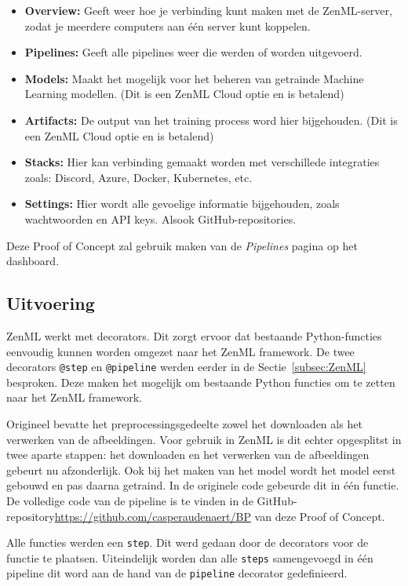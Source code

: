 \begin{itemize}
    \item \textbf{Overview:} Geeft weer hoe je verbinding kunt maken met de ZenML-server, zodat je meerdere computers aan één server kunt koppelen.
    \item \textbf{Pipelines:} Geeft alle pipelines weer die werden of worden uitgevoerd.
    \item \textbf{Models:} Maakt het mogelijk voor het beheren van getrainde Machine Learning modellen. (Dit is een ZenML Cloud optie en is betalend)
    \item \textbf{Artifacts:} De output van het training process word hier bijgehouden. (Dit is een ZenML Cloud optie en is betalend)
    \item \textbf{Stacks:} Hier kan verbinding gemaakt worden met verschillede integraties zoals: Discord, Azure, Docker, Kubernetes, etc.
    \item \textbf{Settings:} Hier wordt alle gevoelige informatie bijgehouden, zoals wachtwoorden en API keys. Alsook GitHub-repositories.
\end{itemize}
Deze Proof of Concept zal gebruik maken van de \textit{Pipelines} pagina op het dashboard.

\subsection{Uitvoering}
ZenML werkt met decorators. Dit zorgt ervoor dat bestaande Python-functies eenvoudig kunnen worden omgezet naar het ZenML framework. De twee decorators \texttt{@step} en \texttt{@pipeline} werden eerder in de Sectie~\ref{subsec:ZenML} besproken. Deze maken het mogelijk om bestaande Python functies om te zetten naar het ZenML framework.

Origineel bevatte het preprocessingsgedeelte zowel het downloaden als het verwerken van de afbeeldingen. Voor gebruik in ZenML is dit echter opgesplitst in twee aparte stappen: het downloaden en het verwerken van de afbeeldingen gebeurt nu afzonderlijk. Ook bij het maken van het model wordt het model eerst gebouwd en pas daarna getraind. In de originele code gebeurde dit in één functie.
De volledige code van de pipeline is te vinden in de GitHub-repository{\url{https://github.com/casperaudenaert/BP}} van deze Proof of Concept. %

Alle functies werden een \texttt{step}. Dit werd gedaan door de decorators voor de functie te plaatsen. Uiteindelijk worden dan alle \texttt{steps} samengevoegd in één pipeline dit word aan de hand van de \texttt{pipeline} decorator gedefinieerd.
